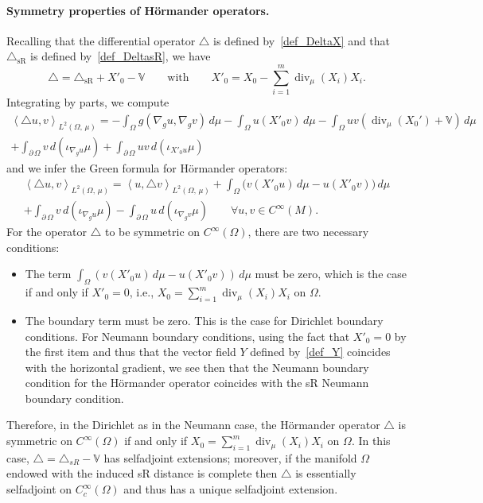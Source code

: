 \documentclass[10pt]{amsart}
\theoremstyle{definition}\newtheorem{defi}[theo]{Definition}\newtheorem{rema}[theo]{Remark}\newtheorem{exam}[theo]{Example}\newtheorem{exem}[theo]{Example}\newtheorem{nota}[theo]{Notation}
\newcommand{\bbV}{\mathbb{V}}
\DeclareMathOperator{\divl}{div}
\newcommand{\trianglesR}{\triangle_{\mathrm{sR}}}
\let\oldforall\forall
\renewcommand*{\forall}{\mathrel{\oldforall}}
\begin{document}
\paragraph{Symmetry properties of H\"ormander operators.} Recalling that the differential operator $\triangle$ is defined by~\eqref{def_DeltaX} and that $\trianglesR$ is defined by~\eqref{def_DeltasR}, we have
\[
\triangle = \trianglesR + X'_0 - \bbV
\qquad\text{with}\qquad X'_0=X_0 - \sum_{i=1}^m\divl_\mu(X_i)X_i.
\]
Integrating by parts, we compute
\begin{multline*}
\left\langle \triangle u,v\right\rangle_{L^2(\Omega,\,\mu)} = -\int_\Omega g\left(\nabla_gu,\nabla_gv\right)\,d\mu - \int_\Omega u(X'_0v)\, d\mu - \int_\Omega uv \left(\divl_\mu\left(X_0'\right)+ \bbV\right) \, d\mu \\
+ \int_{\partial\,\Omega} v\, d\left(\iota_{\nabla_gu} \mu\right) + \int_{\partial\,\Omega} uv\, d\left(\iota_{X'_0u} \mu\right)
\end{multline*}
and we infer the Green formula for H\"ormander operators:
\begin{multline*}
\left\langle \triangle u,v\right\rangle_{L^2(\Omega,\,\mu)} = \left\langle u,\triangle v\right\rangle_{L^2(\Omega,\,\mu)} + \int_\Omega \big(v(X'_0u)\, d\mu - u(X'_0v)\big)\, d\mu \\
+ \int_{\partial\,\Omega} v\, d\left(\iota_{\nabla_gu} \mu\right) - \int_{\partial\,\Omega} u\, d\left(\iota_{\nabla_gv} \mu\right) \qquad \forall u,v\in C^\infty(M).
\end{multline*}
For the operator $\triangle$ to be symmetric on $C^\infty(\Omega)$, there are two necessary conditions:
\begin{itemize}
\item The term $\int_\Omega (v(X'_0u)\, d\mu - u(X'_0v))\, d\mu$ must be zero, which is the case if and only if $X'_0=0$, i.e., $X_0 = \sum_{i=1}^m \divl_\mu(X_i) X_i$ on $\Omega$.
\item The boundary term must be zero. This is the case for Dirichlet boundary conditions. For Neumann boundary conditions, using the fact that $X'_0=0$ by the first item and thus that the vector field $Y$ defined by~\eqref{def_Y} coincides with the horizontal gradient, we see then that the Neumann boundary condition for the H\"ormander operator coincides with the sR Neumann boundary condition.
\end{itemize}
Therefore, in the Dirichlet as in the Neumann case, the H\"ormander operator $\triangle$ is symmetric on $C^\infty(\Omega)$ if and only if $X_0 = \sum_{i=1}^m \divl_\mu(X_i) X_i$ on $\Omega$. In this case, $\triangle = \triangle_{sR} - \bbV$ has selfadjoint extensions; moreover, if the manifold $\Omega$ endowed with the induced sR distance is complete then $\triangle$ is essentially selfadjoint on $C_c^\infty(\Omega)$ and thus has a unique selfadjoint extension.
\end{document}
